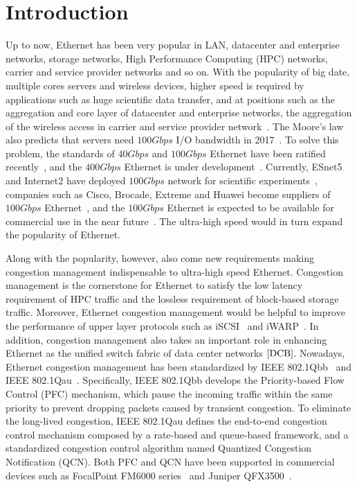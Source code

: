 \documentclass{sig-alternate-10pt}
\begin{document}
\section{Introduction}

Up to now, Ethernet has been very popular in LAN, datacenter and enterprise networks, storage networks, High Performance Computing (HPC) networks, carrier and service provider networks and so on. With the popularity of big date, multiple cores servers and wireless devices, higher speed is required by applications such as huge scientific data transfer, and at positions such as the aggregation and core layer of datacenter and enterprise networks, the aggregation of the wireless access in carrier and service provider network~\cite{roadmap}. The Moore's law also predicts that servers need $100Gbps$ I/O bandwidth in 2017~\cite{commercial}. To solve this problem, the standards of $40Gbps$ and $100Gbps$ Ethernet have been ratified recently~\cite{100G}, and the $400Gbps$ Ethernet is under development~\cite{400G}. Currently, ESnet5 and Internet2 have deployed $100Gbps$ network for scientific experiments~\cite{ESnet5}, companies such as Cisco, Brocade, Extreme and Huawei become suppliers of $100Gbps$ Ethernet~\cite{extreme}, and the $100Gbps$ Ethernet is expected to be available for commercial use in the near future~\cite{commercial}. The ultra-high speed would in turn expand the popularity of Ethernet.


Along with the popularity, however, also come new requirements making congestion management indispensable to ultra-high speed Ethernet. Congestion management is the cornerstone for Ethernet to satisfy the low latency requirement of HPC traffic and the lossless requirement of block-based storage traffic. Moreover, Ethernet congestion management would be helpful to improve the performance of upper layer protocols such as iSCSI~\cite{iSCSI} and iWARP~\cite{iWARP}. In addition, congestion management also takes an important role in enhancing Ethernet as the unified switch fabric of data center networks $\cite{DCB}$. Nowadays, Ethernet congestion management has been standardized by IEEE 802.1Qbb~\cite{802.1Qbb} and IEEE 802.1Qau~\cite{802.1Qau}. Specifically, IEEE 802.1Qbb develops the Priority-based Flow Control (PFC) mechanism, which pause the incoming traffic within the same priority to prevent dropping packets caused by transient congestion. To eliminate the long-lived congestion, IEEE 802.1Qau defines the end-to-end congestion control mechanism composed by a rate-based and queue-based framework, and a standardized congestion control algorithm named Quantized Congestion Notification (QCN). Both PFC and QCN have been supported in commercial devices such as FocalPoint FM6000 series~\cite{FM6000} and Juniper QFX3500~\cite{QFX}.
\end{document}
